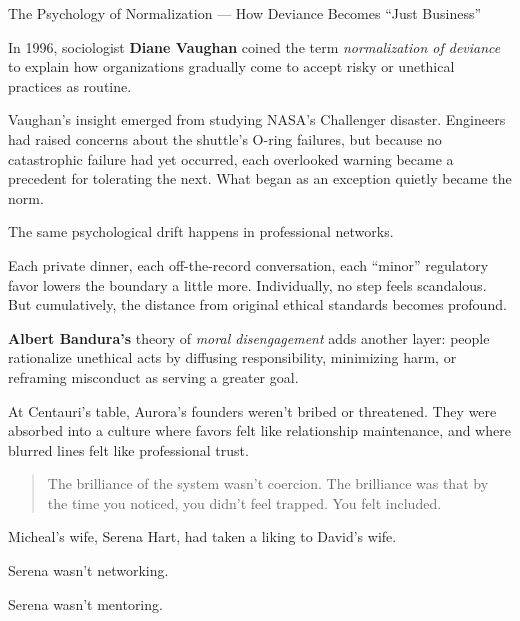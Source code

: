 \begin{PsychologicalSidebar}{The Psychology of Normalization --- How Deviance Becomes ``Just Business''}

  In 1996, sociologist \textbf{Diane Vaughan} coined the term \emph{normalization of deviance} to explain how 
  organizations gradually come to accept risky or unethical practices as routine.

  \medskip
  
  Vaughan’s insight emerged from studying NASA’s Challenger disaster. Engineers had raised concerns about the 
  shuttle’s O-ring failures, but because no catastrophic failure had yet occurred, each overlooked warning became 
  a precedent for tolerating the next. What began as an exception quietly became the norm.

  \medskip
  
  The same psychological drift happens in professional networks.

  \medskip
  
  Each private dinner, each off-the-record conversation, each “minor” regulatory favor lowers the boundary a little more. 
  Individually, no step feels scandalous. But cumulatively, the distance from original ethical standards becomes profound.

  \medskip
  
  \textbf{Albert Bandura’s} theory of \emph{moral disengagement} adds another layer: people rationalize unethical acts by 
  diffusing responsibility, minimizing harm, or reframing misconduct as serving a greater goal.

  \medskip
  
  At Centauri’s table, Aurora’s founders weren’t bribed or threatened. They were absorbed into 
  a culture where favors felt like relationship maintenance, and where blurred lines felt like professional trust.
  
  \begin{quote}
  The brilliance of the system wasn’t coercion.  The brilliance was that by the time you noticed, you didn’t feel trapped.  
  You felt included.
  \end{quote}
  
\end{PsychologicalSidebar}

\medskip

Micheal's wife, Serena Hart, had taken a liking to David’s wife.

Serena wasn’t networking.  

Serena wasn’t mentoring.  

